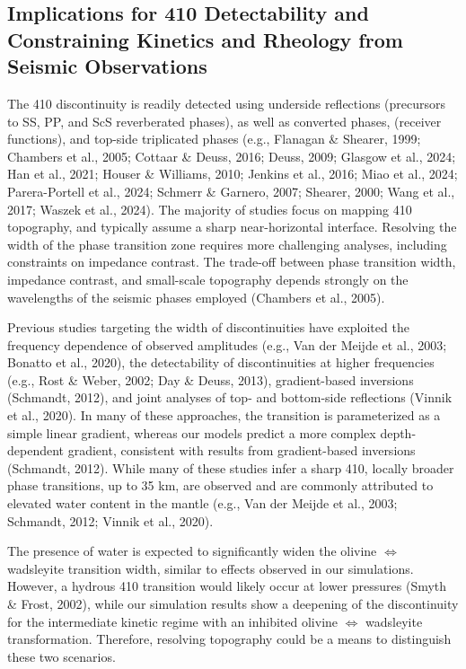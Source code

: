 \documentclass[draft,linenumbers]{agujournal2019}
\begin{document}
\subsection{Implications for 410 Detectability and Constraining Kinetics
and Rheology from Seismic Observations}\label{sec:410-detectability}

The 410 discontinuity is readily detected using underside reflections
(precursors to SS, PP, and ScS reverberated phases), as well as
converted phases, (receiver functions), and top-side triplicated phases
(e.g., Flanagan \& Shearer, 1999; Chambers et al., 2005; Cottaar \&
Deuss, 2016; Deuss, 2009; Glasgow et al., 2024; Han et al., 2021; Houser
\& Williams, 2010; Jenkins et al., 2016; Miao et al., 2024;
Parera-Portell et al., 2024; Schmerr \& Garnero, 2007; Shearer, 2000;
Wang et al., 2017; Waszek et al., 2024). The majority of studies focus
on mapping 410 topography, and typically assume a sharp near-horizontal
interface. Resolving the width of the phase transition zone requires
more challenging analyses, including constraints on impedance contrast.
The trade-off between phase transition width, impedance contrast, and
small-scale topography depends strongly on the wavelengths of the
seismic phases employed (Chambers et al., 2005).

Previous studies targeting the width of discontinuities have exploited
the frequency dependence of observed amplitudes (e.g., Van der Meijde et
al., 2003; Bonatto et al., 2020), the detectability of discontinuities
at higher frequencies (e.g., Rost \& Weber, 2002; Day \& Deuss, 2013),
gradient-based inversions (Schmandt, 2012), and joint analyses of top-
and bottom-side reflections (Vinnik et al., 2020). In many of these
approaches, the transition is parameterized as a simple linear gradient,
whereas our models predict a more complex depth-dependent gradient,
consistent with results from gradient-based inversions (Schmandt, 2012).
While many of these studies infer a sharp 410, locally broader phase
transitions, up to 35 km, are observed and are commonly attributed to
elevated water content in the mantle (e.g., Van der Meijde et al., 2003;
Schmandt, 2012; Vinnik et al., 2020).

The presence of water is expected to significantly widen the olivine
\(\Leftrightarrow\) wadsleyite transition width, similar to effects
observed in our simulations. However, a hydrous 410 transition would
likely occur at lower pressures (Smyth \& Frost, 2002), while our
simulation results show a deepening of the discontinuity for the
intermediate kinetic regime with an inhibited olivine
\(\Leftrightarrow\) wadsleyite transformation. Therefore, resolving
topography could be a means to distinguish these two scenarios.
\end{document}
